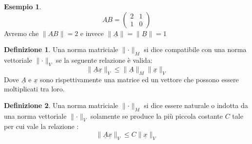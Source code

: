 \documentclass[12pt, a4paper]{book}
\theoremstyle{definition}
\newtheorem{exmp}{Esempio}[section]
\newtheorem{defn}{Definizione}[section]
\newcommand{\VarMtrx}[1]{\ensuremath{\underline{#1}}}
\begin{document}
\begin{flushleft}
\begin{exmp}
\[ 
	\VarMtrx{AB} = \begin{pmatrix} 2 & 1 \\ 1 & 0  \end{pmatrix} 
\]
Avremo che $\lVert \VarMtrx{AB}\rVert = 2$ e invece $\lVert \VarMtrx{A}\rVert  = \lVert\VarMtrx{B}\rVert = 1$
\end{exmp}

\begin{defn}
Una norma matriciale $\lVert\cdot\rVert_{M}$ si dice compatibile con una norma vettoriale  $\lVert\cdot\rVert_{V}$ se la seguente relazione è valida: 
\[  \lVert\VarMtrx{A}\VarMtrx{x}\rVert_{V} \leq \lVert\VarMtrx{A}\rVert_{M}\lVert\VarMtrx{x}\rVert_{V} \]
Dove $\VarMtrx{A}$ e $\VarMtrx{x}$ sono rispettivamente una matrice ed un vettore che possono essere moltiplicati tra loro. 
\end{defn}

\begin{defn}
Una norma matriciale $\lVert\cdot\rVert_{M}$ si dice essere naturale o indotta da una norma vettoriale  $\lVert\cdot\rVert_{V}$
solamente se produce la più piccola costante $C$ tale per cui vale la relazione :
\[ 
	\lVert\VarMtrx{A}\VarMtrx{x}\rVert_{V} \leq C\lVert\VarMtrx{x}\rVert_{V} 
\]
\end{defn}
\end{flushleft}
\end{document}
